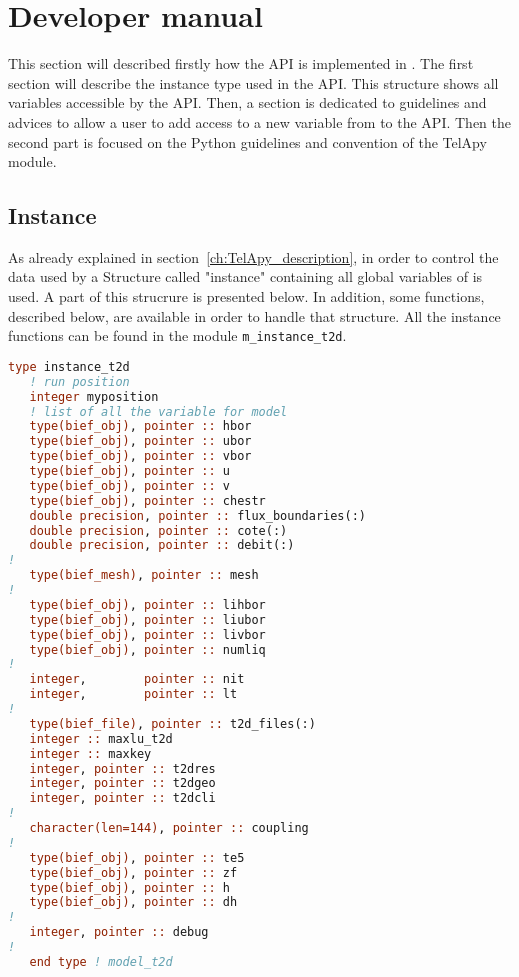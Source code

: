 \chapter{Developer manual}
\label{ch:hydrod:sim}

This section will described firstly how the API is implemented in \fortran.
The first section will describe the instance type used in the API\@. This
structure shows all variables accessible by the \fortran API\@. Then, a
section is dedicated to guidelines and advices to allow a user to add access to
a new variable from  to the API\@.
Then the second part is focused on the Python guidelines and convention
of the TelApy module.
%
\section{Instance}
%
As already explained in section~\ref{ch:TelApy_description}, in order to
control the data used by  a \fortran Structure called "instance"
containing all global variables of  is used. A part of this
strucrure is presented below.  In addition, some functions, described below,
are available in order to handle that structure. All the instance functions can
be found in the module
\verb!m_instance_t2d!.

\begin{lstlisting}[language=Fortran]
type instance_t2d
   ! run position
   integer myposition
   ! list of all the variable for model
   type(bief_obj), pointer :: hbor
   type(bief_obj), pointer :: ubor
   type(bief_obj), pointer :: vbor
   type(bief_obj), pointer :: u
   type(bief_obj), pointer :: v
   type(bief_obj), pointer :: chestr
   double precision, pointer :: flux_boundaries(:)
   double precision, pointer :: cote(:)
   double precision, pointer :: debit(:)
!
   type(bief_mesh), pointer :: mesh
!
   type(bief_obj), pointer :: lihbor
   type(bief_obj), pointer :: liubor
   type(bief_obj), pointer :: livbor
   type(bief_obj), pointer :: numliq
!
   integer,        pointer :: nit
   integer,        pointer :: lt
!
   type(bief_file), pointer :: t2d_files(:)
   integer :: maxlu_t2d
   integer :: maxkey
   integer, pointer :: t2dres
   integer, pointer :: t2dgeo
   integer, pointer :: t2dcli
!
   character(len=144), pointer :: coupling
!
   type(bief_obj), pointer :: te5
   type(bief_obj), pointer :: zf
   type(bief_obj), pointer :: h
   type(bief_obj), pointer :: dh
!
   integer, pointer :: debug
!
   end type ! model_t2d
\end{lstlisting}

